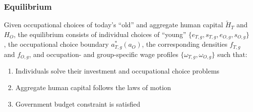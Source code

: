 \documentclass[11pt]{beamer}
\begin{document}
\begin{frame}
\end{frame}

\begin{frame}
\frametitle{Equilibrium}
\label{eqm}
Given occupational choices of today's ``old'' and aggregate human capital $\widetilde{H}_{T}$ and ${H}_{O}$, the equilibrium consists of individual choices of ``young'' $\{e_{T,g}, s_{T,g}, e_{O,g}, s_{O,g}\}$, the occupational choice boundary $a^*_{T,g}(a_O)$, the corresponding densities $f_{T,g}$ and $f_{O,g}$, and occupation- and group-specific wage profiles $\{\omega_{T,g}, \omega_{O,g}\}$ such that:
\begin{enumerate}
	\item Individuals solve their investment and occupational choice problems \hyperlink{time_inv}{} \hyperlink{good_inv}{}
	\item Aggregate human capital follows the laws of motion \hyperlink{laws}{}
	\item Government budget constraint is satisfied
\end{enumerate}
\end{frame}

\end{document}
